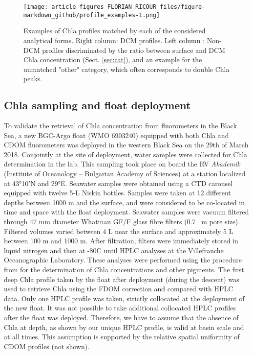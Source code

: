 \documentclass[journal abbreviation, manuscript]{copernicus}
\begin{document}
\begin{figure*}[h!]
    \texttt{[image: article\_figures\_FLORIAN\_RICOUR\_files/figure-markdown\_github/profile\_examples-1.png]}
    \caption{
    Examples of Chla profiles matched by each of the considered analytical forms.
    Right column: DCM profiles.
    Left column : Non-DCM profiles discriminated by the ratio between surface and DCM Chla concentration (Sect. \ref{sec:cat}), and an example for the unmatched "other" category,  which often corresponds to double Chla peaks.}
    \label{fig:5_shapes}
\end{figure*}

\subsection{Chla sampling and float deployment}
\label{sec:hplc_deployment}
To validate the retrieval of Chla concentration from fluorometers in the Black Sea, a new BGC-Argo float (WMO 6903240) equipped with both Chla and CDOM fluorometers was deployed in the western Black Sea on the 29th of March 2018. Conjointly at the site of deployment, water samples were collected for Chla determination in the lab. This sampling took place on board the RV \textit{Akademik} (Institute of Oceanology – Bulgarian Academy of Sciences) at a station localized at 43°10'N and 29°E. Seawater samples were obtained using a CTD carousel equipped with twelve 5-\unit{L} Niskin bottles. Samples were taken at 12 different depths between 1000 \unit{m} and the surface, and were considered to be co-located in time and space with the float deployment. Seawater samples were vacuum filtered through 47 \unit{mm} diameter Whatman GF/F glass fibre filters (0.7 \unit{\mu m} pore size). Filtered volumes varied between 4 \unit{L} near the surface and approximately 5 \unit{L} between 100 \unit{m} and 1000 \unit{m}. After filtration, filters were immediately stored in liquid nitrogen and then at -80\textdegree C until HPLC analyses at the Villefranche Oceanographic Laboratory. These analyses were performed using the procedure from \citet{Ras2008} for the determination of Chla concentrations and other pigments. The first deep Chla profile taken by the float after deployment (during the descent) was 
used to retrieve Chla using the FDOM correction and compared with HPLC data.
Only one HPLC profile was taken, strictly collocated at the deployment of the new float. It was not possible to take additional collocated HPLC profiles after the float was deployed.
Therefore, we have to assume that the absence of Chla at depth, as shown by our unique HPLC profile, is valid at basin scale and at all times. This assumption is supported by the relative spatial uniformity of CDOM profiles (not shown).
\end{document}
